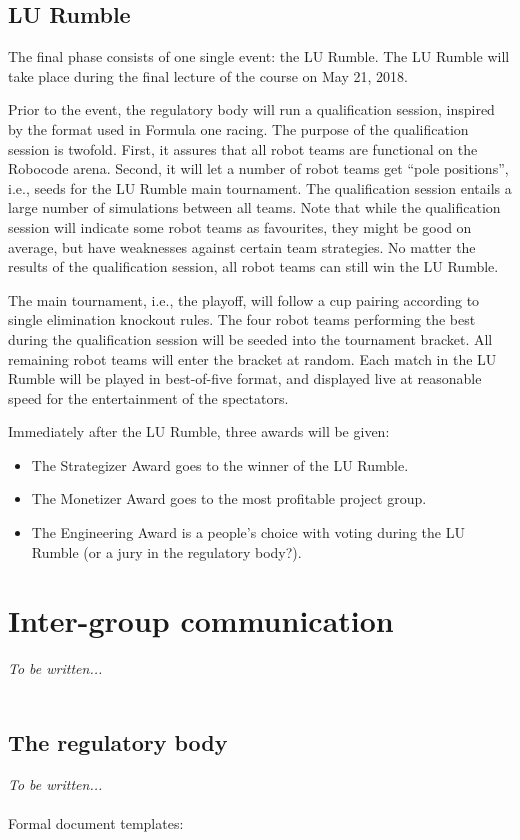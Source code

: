 \documentclass{scrreprt}
\begin{document}
\section{LU Rumble}
The final phase consists of one single event: the LU Rumble. The LU Rumble will take place during the final lecture of the course on May 21, 2018.

Prior to the event, the regulatory body will run a qualification session, inspired by the format used in Formula one racing. The purpose of the qualification session is twofold. First, it assures that all robot teams are functional on the Robocode arena. Second, it will let a number of robot teams get ``pole positions'', i.e., seeds for the LU Rumble main tournament. The qualification session entails a large number of simulations between all teams. Note that while the qualification session will indicate some robot teams as favourites, they might be good on average, but have weaknesses against certain team strategies. No matter the results of the qualification session, all robot teams can still win the LU Rumble.  

The main tournament, i.e., the playoff, will follow a cup pairing according to single elimination knockout rules. The four robot teams performing the best during the qualification session will be seeded into the tournament bracket. All remaining robot teams will enter the bracket at random. Each match in the LU Rumble will be played in best-of-five format, and displayed live at reasonable speed for the entertainment of the spectators.

Immediately after the LU Rumble, three awards will be given:
\begin{itemize}
\item The Strategizer Award goes to the winner of the LU Rumble.
\item The Monetizer Award goes to the most profitable project group.
\item The Engineering Award is a people's choice with voting during the LU Rumble (or a jury in the regulatory body?).
\end{itemize}

\chapter{Inter-group communication}
\emph{To be written...}\\\\

\section{The regulatory body} \label{sec:regbody}
\emph{To be written...}\\\\
Formal document templates:
\end{document}
